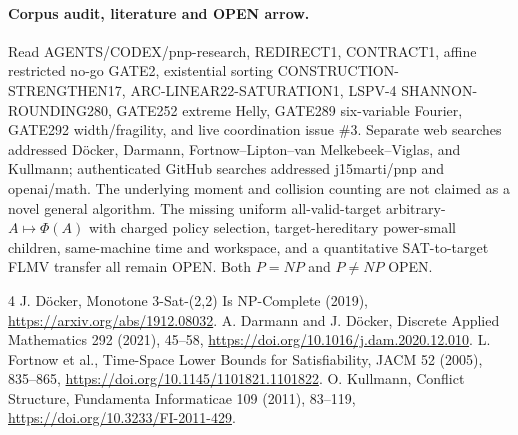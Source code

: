 \documentclass[11pt]{article}
\begin{document}
\paragraph{Corpus audit, literature and OPEN arrow.}
Read AGENTS/CODEX/pnp-research, REDIRECT1, CONTRACT1, affine restricted no-go GATE2, existential sorting CONSTRUCTION-STRENGTHEN17, ARC-LINEAR22-SATURATION1, LSPV-4 SHANNON-ROUNDING280, GATE252 extreme Helly, GATE289 six-variable Fourier, GATE292 width/fragility, and live coordination issue \#3. Separate web searches addressed D\"ocker, Darmann, Fortnow--Lipton--van Melkebeek--Viglas, and Kullmann; authenticated GitHub searches addressed j15marti/pnp and openai/math. The underlying moment and collision counting are not claimed as a novel general algorithm. The missing uniform all-valid-target arbitrary-$A\mapsto\Phi(A)$ with charged policy selection, target-hereditary power-small children, same-machine time and workspace, and a quantitative SAT-to-target FLMV transfer all remain OPEN. Both $P=NP$ and $P\ne NP$ OPEN.

\begin{thebibliography}{4}
 J. D\"ocker, Monotone 3-Sat-(2,2) Is NP-Complete (2019), \url{https://arxiv.org/abs/1912.08032}.
 A. Darmann and J. D\"ocker, Discrete Applied Mathematics 292 (2021), 45--58, \url{https://doi.org/10.1016/j.dam.2020.12.010}.
 L. Fortnow et al., Time-Space Lower Bounds for Satisfiability, JACM 52 (2005), 835--865, \url{https://doi.org/10.1145/1101821.1101822}.
 O. Kullmann, Conflict Structure, Fundamenta Informaticae 109 (2011), 83--119, \url{https://doi.org/10.3233/FI-2011-429}.
\end{thebibliography}
\end{document}
